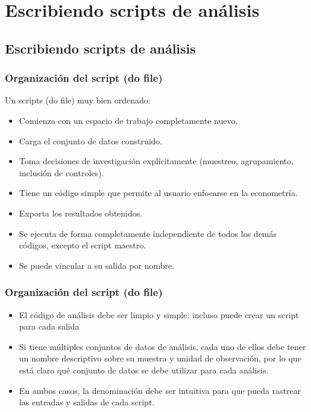 \documentclass[10pt, aspectratio=169, compress]{beamer}
\begin{document}
\section{Escribiendo scripts de análisis}
\subsection{Escribiendo scripts de análisis}
\begin{frame}
	\frametitle{Organización del script (do file)}
	Un scripts (do file) muy bien ordenado:
	\begin{itemize}[<+->]
		\item Comienza con un espacio de trabajo completamente nuevo.
		\item Carga el conjunto de datos construido.
		\item Toma decisiones de investigación explícitamente (muestreo, agrupamiento, inclusión de controles).
		\item Tiene un código simple que permite al usuario enfocarse en la econometría.
		\item Exporta los resultados obtenidos.
		\item Se ejecuta de forma completamente independiente de todos los demás códigos, excepto el script maestro.
		\item Se puede vincular a su salida por nombre.
	\end{itemize}
\end{frame}
\begin{frame}
	\frametitle{Organización del script (do file)}
	\begin{itemize}[<+->]
		\item El código de análisis debe ser limpio y simple: incluso puede crear un script para cada salida
		\item Si tiene múltiples conjuntos de datos de análisis, cada uno de ellos debe tener un nombre descriptivo sobre su muestra y unidad de observación, por lo que está claro qué conjunto de datos se debe utilizar para cada análisis.
		\item En ambos casos, la denominación debe ser intuitiva para que pueda rastrear las entradas y salidas de cada script.
	\end{itemize}
\end{frame}
\end{document}
